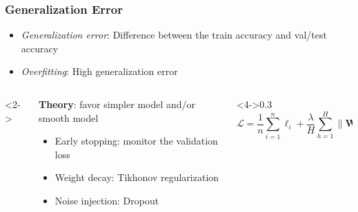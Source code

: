 \documentclass[pressentation,10pt,aspectratio=169,xcolor=table, colorlinks=true]{beamer}
\begin{document}
\begin{frame}
  \frametitle{Generalization Error}
  \begin{itemize}
  \item \emph{Generalization error}: Difference between the train accuracy and val/test accuracy
  \item \emph{Overfitting}: High generalization error
    \begin{center}
    \end{center}
  \end{itemize}
    
  \begin{columns}<2->
    \begin{column}{0.6\linewidth}
      \textbf{Theory}: favor simpler model and/or smooth model
      \begin{itemize}
      \item <3-> Early stopping: monitor the validation loss
      \item <4-> Weight decay: Tikhonov regularization 
      \item <5-> Noise injection: Dropout
      \end{itemize}
    \end{column}
    \begin{column}[c]<4->{0.3\linewidth}
      \[\mathcal{L} = \frac{1}{n}\sum_{i=1}^n\ell_i + \frac{\lambda}{H}\sum_{h=1}^H\|\mathbf{W}_h\|^2_2\]
    \end{column}
  \end{columns}
\end{frame}
\end{document}
